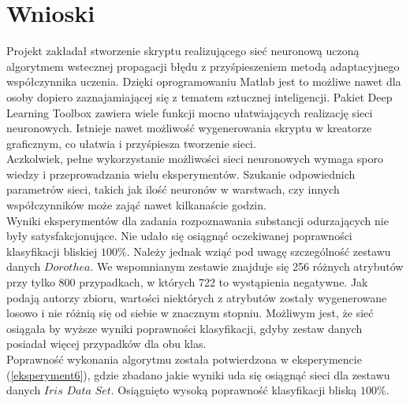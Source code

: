 \documentclass[a4paper, openright, twoside,11pt]{article}
\begin{document}
    \section{Wnioski}
    Projekt zakładał stworzenie skryptu realizującego sieć neuronową uczoną algorytmem wstecznej propagacji błędu z przyśpieszeniem metodą adaptacyjnego współczynnika uczenia. Dzięki oprogramowaniu Matlab jest to możliwe nawet dla osoby dopiero zaznajamiającej się z tematem sztucznej inteligencji. Pakiet Deep Learning Toolbox zawiera wiele funkcji mocno ułatwiających realizację sieci neuronowych. Istnieje nawet możliwość wygenerowania skryptu w kreatorze graficznym, co ułatwia i przyśpiesza tworzenie sieci.\\[0.2cm]
    Aczkolwiek, pełne wykorzystanie możliwości sieci neuronowych wymaga sporo wiedzy i przeprowadzania wielu eksperymentów. Szukanie odpowiednich parametrów sieci, takich jak ilość neuronów w warstwach, czy innych współczynników może zająć nawet kilkanaście godzin.\\[0.5cm]
    Wyniki eksperymentów dla zadania rozpoznawania substancji odurzających nie były satysfakcjonujące. Nie udało się osiągnąć oczekiwanej poprawności klasyfikacji bliskiej $100\%$. Należy jednak wziąć pod uwagę szczególność zestawu danych $Dorothea$. We wspomnianym zestawie znajduje się 256 różnych atrybutów przy tylko 800 przypadkach, w których 722 to wystąpienia negatywne. Jak podają autorzy zbioru, wartości niektórych z atrybutów zostały wygenerowane losowo i nie różnią się od siebie w znacznym stopniu. Możliwym jest, że sieć osiągała by wyższe wyniki poprawności klasyfikacji, gdyby zestaw danych posiadał więcej przypadków dla obu klas.\\[0.2cm]
    Poprawność wykonania algorytmu została potwierdzona w eksperymencie (\ref{eksperyment6}), gdzie zbadano jakie wyniki uda się osiągnąć sieci dla zestawu danych $Iris$ $Data$ $Set$. Osiągnięto wysoką poprawność klasyfikacji bliską $100\%$.
   
    
    
\end{document}
